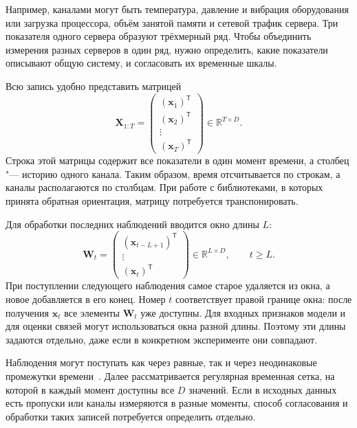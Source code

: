 \documentclass[bachelor, och, diploma]{SCWorks}
\begin{document}
Например, каналами могут быть температура, давление и вибрация оборудования или загрузка процессора, объём занятой памяти и сетевой трафик сервера. Три показателя одного сервера образуют трёхмерный ряд. Чтобы объединить измерения разных серверов в один ряд, нужно определить, какие показатели описывают общую систему, и согласовать их временные шкалы.

Всю запись удобно представить матрицей
\begin{equation}
    \mathbf{X}_{1:T} =
    \begin{pmatrix}
        (\mathbf{x}_1)^{\mathsf T} \\
        (\mathbf{x}_2)^{\mathsf T} \\
        \vdots \\
        (\mathbf{x}_T)^{\mathsf T}
    \end{pmatrix}
    \in \mathbb{R}^{T\times D}.
    \label{eq:mvts-record}
\end{equation}
Строка этой матрицы содержит все показатели в один момент времени, а столбец "--- историю одного канала. Таким образом, время отсчитывается по строкам, а каналы располагаются по столбцам. При работе с библиотеками, в которых принята обратная ориентация, матрицу потребуется транспонировать.

Для обработки последних наблюдений вводится окно длины $L$:
\begin{equation}
    \mathbf{W}_t =
    \begin{pmatrix}
        (\mathbf{x}_{t-L+1})^{\mathsf T} \\
        \vdots \\
        (\mathbf{x}_t)^{\mathsf T}
    \end{pmatrix}
    \in \mathbb{R}^{L\times D}, \qquad t\geq L.
    \label{eq:mvts-window}
\end{equation}
При поступлении следующего наблюдения самое старое удаляется из окна, а новое добавляется в его конец. Номер $t$ соответствует правой границе окна: после получения $\mathbf{x}_t$ все элементы $\mathbf{W}_t$ уже доступны. Для входных признаков модели и для оценки связей могут использоваться окна разной длины. Поэтому эти длины задаются отдельно, даже если в конкретном эксперименте они совпадают.

Наблюдения могут поступать как через равные, так и через неодинаковые промежутки времени~\cite{jin2024gnn4ts}. Далее рассматривается регулярная временная сетка, на которой в каждый момент доступны все $D$ значений. Если в исходных данных есть пропуски или каналы измеряются в разные моменты, способ согласования и обработки таких записей потребуется определить отдельно.
\end{document}
